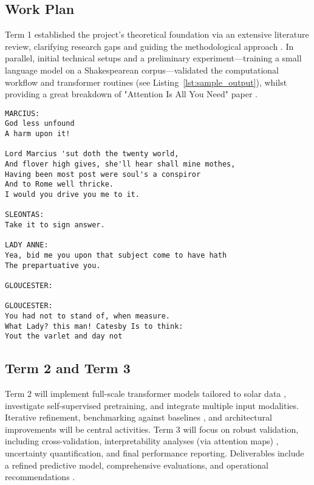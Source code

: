 \subsection{Work Plan}
Term 1 established the project’s theoretical foundation via an extensive literature review, clarifying research gaps and guiding the methodological approach \cite{RefWorks:RefID:27-minaeelarge}. In parallel, initial technical setups and a preliminary experiment—training a small language model on a Shakespearean corpus—validated the computational workflow and transformer routines (see Listing~\ref{lst:sample_output}), whilst providing a great breakdown of "Attention Is All You Need" paper \cite{RefWorks:RefID:3-vaswani2023provided}.

\begin{lstlisting}[caption={Sample Output from the Preliminary Language Model}, label={lst:sample_output}]
MARCIUS:
God less unfound
A harm upon it!

Lord Marcius 'sut doth the twenty world,
And flover high gives, she'll hear shall mine mothes,
Having been most post were soul's a conspiror
And to Rome well thricke.
I would you drive you me to it.

SLEONTAS:
Take it to sign answer.

LADY ANNE:
Yea, bid me you upon that subject come to have hath
The prepartuative you.

GLOUCESTER:

GLOUCESTER:
You had not to stand of, when measure.
What Lady? this man! Catesby Is to think:
Yout the varlet and day not
\end{lstlisting}

\subsection{Term 2 and Term 3}
Term 2 will implement full-scale transformer models tailored to solar data \cite{RefWorks:RefID:33-francisco2024multimodal}, investigate self-supervised pretraining, and integrate multiple input modalities. Iterative refinement, benchmarking against baselines \cite{RefWorks:RefID:30-schmude2024prithvi}, and architectural improvements will be central activities. Term 3 will focus on robust validation, including cross-validation, interpretability analyses (via attention maps) \cite{RefWorks:RefID:29-hoffmanntraining}, uncertainty quantification, and final performance reporting. Deliverables include a refined predictive model, comprehensive evaluations, and operational recommendations \cite{RefWorks:RefID:35-licllmate:}.

